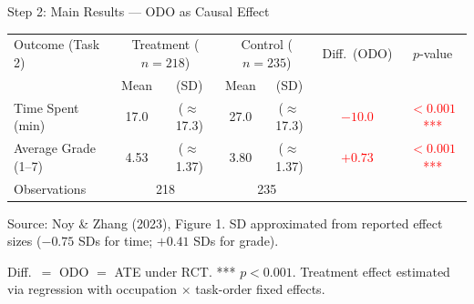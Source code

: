 \documentclass[hyperref={pdfpagelabels=false}]{beamer}
\begin{document}
	\begin{frame}{Step 2: Main Results --- ODO as Causal Effect}
		\begin{center}
			\begin{threeparttable}
				\linespread{1}
				\fontsize{8.5}{8.5pt}\selectfont
				\centering
				\begin{tabular}{@{}lcccccc@{}}
					\toprule
					Outcome (Task 2) & \multicolumn{2}{c}{Treatment ($n=218$)} & \multicolumn{2}{c}{Control ($n=235$)} & Diff.\ (ODO) & $p$-value \\
					& Mean & (SD) & Mean & (SD) & & \\
					\midrule\midrule
					Time Spent (min) & 17.0 & ($\approx$17.3) & 27.0 & ($\approx$17.3) & \textcolor{red}{$-10.0$} & \textcolor{red}{$<0.001$***} \\
					Average Grade (1--7) & 4.53 & ($\approx$1.37) & 3.80 & ($\approx$1.37) & \textcolor{red}{$+0.73$} & \textcolor{red}{$<0.001$***} \\
					\midrule\midrule
					Observations & \multicolumn{2}{c}{218} & \multicolumn{2}{c}{235} & & \\
					\bottomrule
				\end{tabular}
				\begin{tablenotes}
					\fontsize{7}{7pt}\selectfont
					\item Source: Noy \& Zhang (2023), Figure 1. SD approximated from reported effect sizes ($-0.75$ SDs for time; $+0.41$ SDs for grade).
					\item Diff.\ $=$ ODO $=$ ATE under RCT. *** $p<0.001$. Treatment effect estimated via regression with occupation $\times$ task-order fixed effects.
				\end{tablenotes}
			\end{threeparttable}
		\end{center}
	\end{frame}
	
\end{document}
